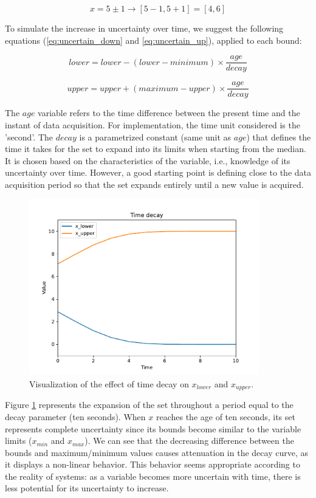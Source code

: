 $$x = 5 \pm 1 \rightarrow [5-1, 5+1] = [4, 6]$$

To simulate the increase in uncertainty over time, we suggest the following equations (\ref{eq:uncertain_down} and \ref{eq:uncertain_up}), applied to each bound:

\begin{equation} \label{eq:uncertain_down}
lower = lower - (lower - minimum) \times \frac{age}{decay}
\end{equation}

\begin{equation} \label{eq:uncertain_up}
upper = upper + (maximum - upper) \times \frac{age}{decay}
\end{equation}

The $age$ variable refers to the time difference between the present time and the instant of data acquisition. For implementation, the time unit considered is the 'second'. The $decay$ is a parametrized constant (same unit as $age$) that defines the time it takes for the set to expand into its limits when starting from the median. It is chosen based on the characteristics of the variable, i.e., knowledge of its uncertainty over time. However, a good starting point is defining close to the data acquisition period so that the set expands entirely until a new value is acquired.

\begin{figure}[h!]
    \centering
    \includegraphics[width=10cm]{figures/chapter4/cell/time_decay.pdf}
    \caption{Visualization of the effect of time decay on $x_{lower}$ and $x_{upper}$.}
    \label{fig:timedecay}
\end{figure}

Figure \ref{fig:timedecay} represents the expansion of the set throughout a period equal to the decay parameter (ten seconds). When $x$ reaches the age of ten seconds, its set represents complete uncertainty since its bounds become similar to the variable limits ($x_{min}$ and $x_{max}$). We can see that the decreasing difference between the bounds and maximum/minimum values causes attenuation in the decay curve, as it displays a non-linear behavior. This behavior seems appropriate according to the reality of systems: as a variable becomes more uncertain with time, there is less potential for its uncertainty to increase.


